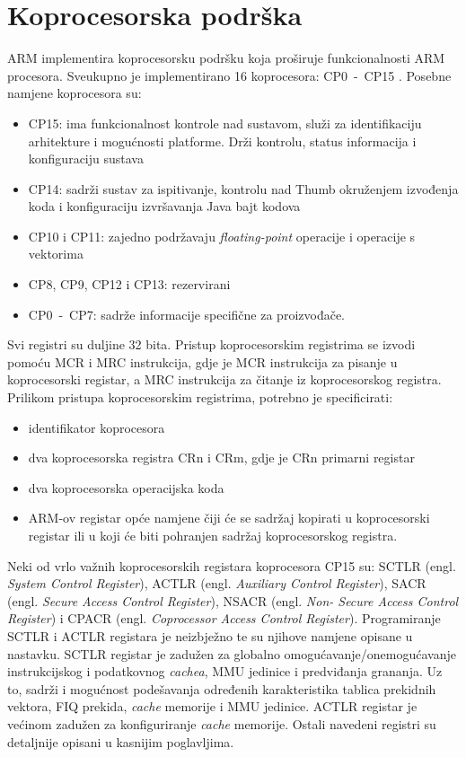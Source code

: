 \documentclass[times, utf8, diplomski, numeric]{fer}
\begin{document}
\section{Koprocesorska podrška}
ARM implementira koprocesorsku podršku koja proširuje funkcionalnosti ARM procesora. Sveukupno je implementirano 16 koprocesora:
CP0~-~CP15 \cite{arch_man}. Posebne namjene koprocesora su:
\begin{itemize}
  \item{CP15: ima funkcionalnost kontrole nad sustavom, služi za identifikaciju arhitekture i mogućnosti platforme. Drži
  kontrolu, status informacija i konfiguraciju sustava}
  \item{CP14: sadrži sustav za ispitivanje, kontrolu nad Thumb okruženjem izvođenja koda i konfiguraciju izvršavanja Java
  bajt kodova}
  \item{CP10 i CP11: zajedno podržavaju \textit{floating-point} operacije i operacije s vektorima}
  \item{CP8, CP9, CP12 i CP13: rezervirani}
  \item{CP0~-~CP7: sadrže informacije specifične za proizvođače.}
\end{itemize}
Svi registri su duljine 32 bita. Pristup koprocesorskim registrima se izvodi pomoću MCR i MRC instrukcija, gdje je MCR
instrukcija za pisanje u koprocesorski registar, a MRC instrukcija za čitanje iz koprocesorskog registra.
Prilikom pristupa koprocesorskim registrima, potrebno je specificirati:
\begin{itemize}
  \item{identifikator koprocesora}
  \item{dva koprocesorska registra CRn i CRm, gdje je CRn primarni registar}
  \item{dva koprocesorska operacijska koda}
  \item{ARM-ov registar opće namjene čiji će se sadržaj kopirati u koprocesorski registar ili u koji će biti pohranjen
  sadržaj koprocesorskog registra.}
\end{itemize}
Neki od vrlo važnih koprocesorskih registara koprocesora CP15 su: SCTLR (engl. \textit{System Control Register}), ACTLR
(engl. \textit{Auxiliary Control Register}), SACR (engl. \textit{Secure Access Control Register}), NSACR (engl. \textit{Non-
Secure Access Control Register}) i CPACR (engl. \textit{Coprocessor Access Control Register}). Programiranje SCTLR i ACTLR
registara je neizbježno te su njihove namjene opisane u nastavku. SCTLR registar je zadužen za globalno
omogućavanje/onemogućavanje instrukcijskog i podatkovnog \textit{cachea}, MMU jedinice i predviđanja grananja. Uz to, sadrži
i mogućnost podešavanja određenih karakteristika tablica prekidnih vektora, FIQ prekida, \textit{cache} memorije i MMU jedinice.
ACTLR registar je većinom zadužen za konfiguriranje \textit{cache} memorije. Ostali navedeni registri su detaljnije opisani u
kasnijim poglavljima.
\end{document}
